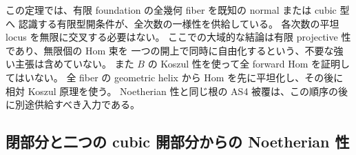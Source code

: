 \begin{remark}[有限型認識で必要な入力の順序]
この定理では、有限 foundation の全幾何 fiber を既知の normal または cubic 型へ
認識する有限型開条件が、全次数の一様性を供給している。
各次数の平坦 locus を無限に交叉する必要はない。
ここでの大域的な結論は有限 projective 性であり、無限個の Hom 束を
一つの開上で同時に自由化するという、不要な強い主張は含めていない。
また $B$ の Koszul 性を使って全 forward Hom を証明してはいない。
全 fiber の geometric helix から Hom を先に平坦化し、その後に相対 Koszul 原理を使う。
Noetherian 性と同じ根の AS4 被覆は、この順序の後に別途供給すべき入力である。
\end{remark}

\subsection{閉部分と二つの cubic 開部分からの Noetherian 性}

